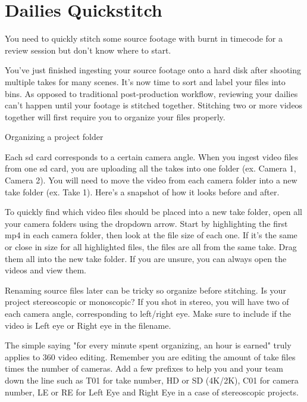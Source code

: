 \chapter{Dailies Quickstitch}
\pagecolor{white}
\label{chap:30}
\begin{fullwidth}

\problem

{\large You need to quickly stitch some source footage with burnt in timecode for a review session but don't know where to start. \par}

You've just finished ingesting your source footage onto a hard disk after shooting multiple takes for many scenes. It's now time to sort and label your files into bins. As opposed to traditional post-production workflow, reviewing your dailies can't happen until your footage is stitched together. Stitching two or more videos together will first require you to organize your files properly.

\solution

{\large Organizing a project folder \par}

Each sd card corresponds to a certain camera angle. When you ingest video files from one sd card, you are uploading all the takes into one folder (ex. Camera 1, Camera 2). You will need to move the video from each camera folder into a new take folder (ex. Take 1). Here's a snapshot of how it looks before and after.


To quickly find which video files should be placed into a new take folder, open all your camera folders using the dropdown arrow. Start by highlighting the first mp4 in each camera folder, then look at the file size of each one. If it's the same or close in size for all highlighted files, the files are all from the same take. Drag them all into the new take folder. If you are unsure, you can always open the videos and view them.

Renaming source files later can be tricky so organize before stitching. Is your project stereoscopic or monoscopic? If you shot in stereo, you will have two of each camera angle, corresponding to left/right eye. Make sure to include if the video is Left eye or Right eye in the filename.

The simple saying "for every minute spent organizing, an hour is earned" truly applies to 360 video editing. Remember you are editing the amount of take files times the number of cameras. Add a few prefixes to help you and your team down the line such as T01 for take number, HD or SD (4K/2K), C01 for camera number, LE or RE for Left Eye and Right Eye in a case of stereoscopic projects.


\end{fullwidth}

